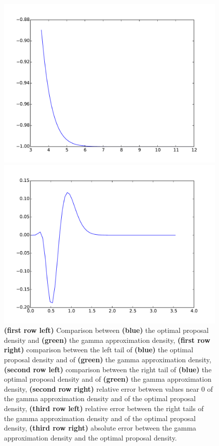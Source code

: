 \documentclass{article}
\begin{document}
\begin{figure}[htb]
\begin{minipage}{.45\textwidth}
		\includegraphics[width=0.97\linewidth]{bootstrap-filter/relative_tail_simple_3_3.pdf}
	\end{minipage}
	\begin{minipage}{.45\textwidth}
		\centering
		\includegraphics[width=0.97\linewidth]{bootstrap-filter/absolute_simple_3_3.pdf}
	\end{minipage}
	\caption{\textbf{(first row left)} Comparison between \textbf{(blue)} the optimal proposal density and \textbf{(green)} the gamma approximation density, \textbf{(first row right)} comparison between  the left tail of \textbf{(blue)} the optimal proposal density and of \textbf{(green)} the gamma approximation density, \textbf{(second row left)} comparison between the right tail of \textbf{(blue)} the optimal proposal density and of \textbf{(green)} the gamma approximation density, \textbf{(second row right)} relative error between values near 0 of the gamma approximation density and of the optimal proposal density, \textbf{(third row left)} relative error between the right tails of the gamma approximation density and of the optimal proposal density, \textbf{(third row right)} absolute error between the gamma approximation density and the optimal proposal density.}
	\label{fig:simple}
\end{figure}
\end{document}
